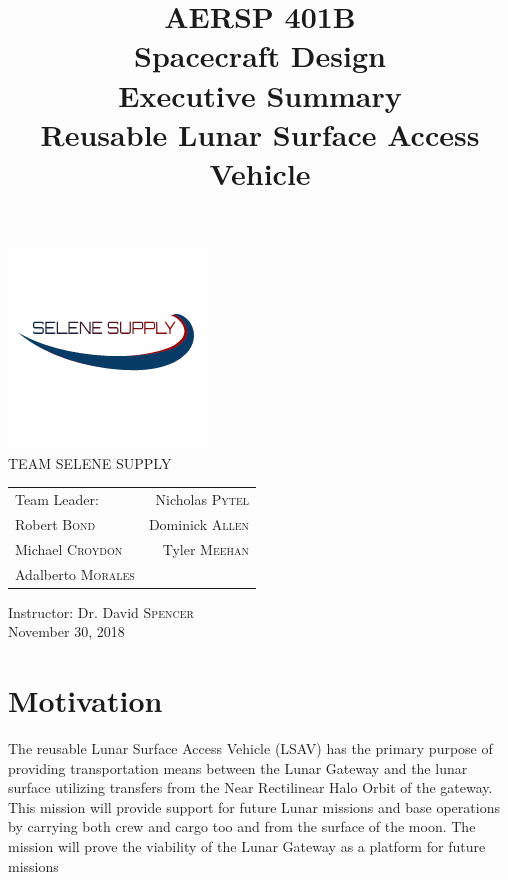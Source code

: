 \documentclass[10pt]{article}
\title{
  AERSP 401B \\
  Spacecraft Design \\
  Executive Summary \\
  Reusable Lunar Surface Access Vehicle \\
}
\date{}
\begin{document}
\doublespacing

\clearpage\maketitle
\thispagestyle{empty}

\begin{center}
  \includegraphics{SeleneSupplyLogo}\hspace*{\fill}\\  
  TEAM SELENE SUPPLY \\
  \begin{tabular}{l r}
    Team Leader: & Nicholas \textsc{Pytel} \\
    Robert \textsc{Bond} & Dominick \textsc{Allen} \\
    Michael \textsc{Croydon}  & Tyler \textsc{Meehan} \\
    Adalberto \textsc{Morales}\\
  \end{tabular}

  \hspace{1cm} \newline
  \hspace{1cm} \newline
  Instructor: Dr. David \textsc{Spencer} \\
  November 30, 2018
\end{center}

\newpage
\setcounter{page}{1}

\newpage

\section{Motivation}

The reusable Lunar Surface Access Vehicle (LSAV) has the primary
purpose of providing transportation means between the Lunar Gateway
and the lunar surface utilizing transfers from the Near Rectilinear
Halo Orbit of the gateway. This mission will provide support for
future Lunar missions and base operations by carrying both crew and
cargo too and from the surface of the moon. The mission will prove the
viability of the Lunar Gateway as a platform for future missions
\end{document}
